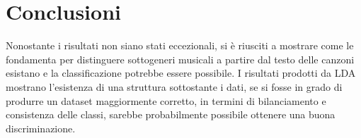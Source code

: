 \documentclass[technote]{IEEEtran}
\begin{document}
\section{Conclusioni}
Nonostante i risultati non siano stati eccezionali, si è riusciti a mostrare come le fondamenta per distinguere sottogeneri musicali a partire dal testo delle canzoni esistano e la classificazione potrebbe essere possibile. I risultati prodotti da LDA mostrano l'esistenza di una struttura sottostante i dati, se si fosse in grado di produrre un dataset maggiormente corretto, in termini di bilanciamento e consistenza delle classi, sarebbe probabilmente possibile ottenere una buona discriminazione. 


\end{document}
